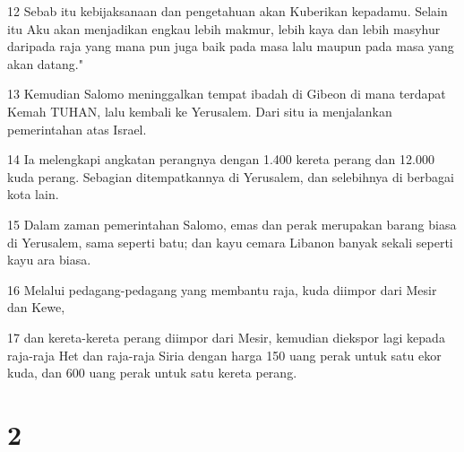 \par 12 Sebab itu kebijaksanaan dan pengetahuan akan Kuberikan kepadamu. Selain itu Aku akan menjadikan engkau lebih makmur, lebih kaya dan lebih masyhur daripada raja yang mana pun juga baik pada masa lalu maupun pada masa yang akan datang."
\par 13 Kemudian Salomo meninggalkan tempat ibadah di Gibeon di mana terdapat Kemah TUHAN, lalu kembali ke Yerusalem. Dari situ ia menjalankan pemerintahan atas Israel.
\par 14 Ia melengkapi angkatan perangnya dengan 1.400 kereta perang dan 12.000 kuda perang. Sebagian ditempatkannya di Yerusalem, dan selebihnya di berbagai kota lain.
\par 15 Dalam zaman pemerintahan Salomo, emas dan perak merupakan barang biasa di Yerusalem, sama seperti batu; dan kayu cemara Libanon banyak sekali seperti kayu ara biasa.
\par 16 Melalui pedagang-pedagang yang membantu raja, kuda diimpor dari Mesir dan Kewe,
\par 17 dan kereta-kereta perang diimpor dari Mesir, kemudian diekspor lagi kepada raja-raja Het dan raja-raja Siria dengan harga 150 uang perak untuk satu ekor kuda, dan 600 uang perak untuk satu kereta perang.

\chapter{2}

